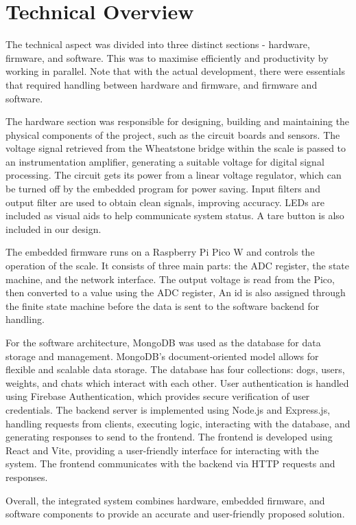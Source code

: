 
\chapter{Technical Overview}
The technical aspect was divided into three distinct sections - hardware, firmware, and software. This was to maximise efficiently and productivity by working in parallel. Note that with the actual development, there were essentials that required handling between hardware and firmware, and firmware and software.

The hardware section was responsible for designing, building and maintaining the physical components of the project, such as the circuit boards and sensors. The voltage signal retrieved from the Wheatstone bridge within the scale is passed to an instrumentation amplifier, generating a suitable voltage for digital signal processing. The circuit gets its power from a linear voltage regulator, which can be turned off by the embedded program for power saving. Input filters and output filter are used to obtain clean signals, improving accuracy. LEDs are included as visual aids to help communicate system status. A tare button is also included in our design.

The embedded firmware runs on a Raspberry Pi Pico W and controls the operation of the scale. It consists of three main parts: the ADC register, the state machine, and the network interface. The output voltage is read from the Pico, then converted to a value using the ADC register, An id is also assigned through the finite state machine before the data is sent to the software backend for handling.

For the software architecture, MongoDB was used as the database for data storage and management. MongoDB's document-oriented model allows for flexible and scalable data storage. The database has four collections: dogs, users, weights, and chats which interact with each other. User authentication is handled using Firebase Authentication, which provides secure verification of user credentials. The backend server is implemented using Node.js and Express.js, handling requests from clients, executing logic, interacting with the database, and generating responses to send to the frontend. The frontend is developed using React and Vite, providing a user-friendly interface for interacting with the system. The frontend communicates with the backend via HTTP requests and responses.

Overall, the integrated system combines hardware, embedded firmware, and software components to provide an accurate and user-friendly proposed solution.